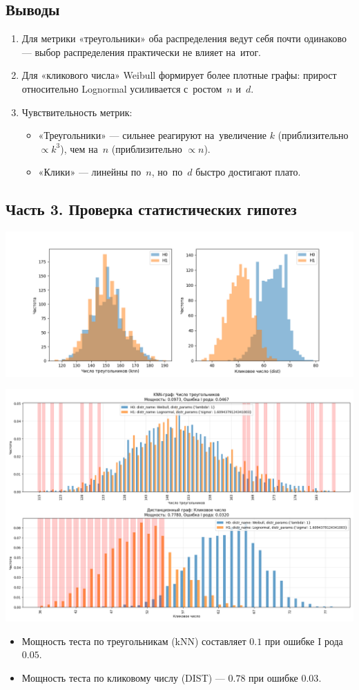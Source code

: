 \documentclass[12pt,a4paper]{article}
\begin{document}
\subsection*{Выводы}

\begin{enumerate}
  \item Для метрики «треугольники» оба распределения ведут себя почти одинаково --- выбор распределения практически не влияет на~итог.
  \item Для «кликового числа» Weibull формирует более плотные графы: прирост относительно Lognormal усиливается с~ростом~$n$ и~$d$.
  \item Чувствительность метрик:
        \begin{itemize}
          \item «Треугольники» --- сильнее реагируют на~увеличение $k$ (приблизительно $\propto k^{3}$), чем на~$n$ (приблизительно $\propto n$).
          \item «Клики» --- линейны по~$n$, но~по~$d$ быстро достигают плато.
        \end{itemize}
\end{enumerate}

\subsection*{Часть 3. Проверка статистических гипотез}
\vspace{-1em}

\begin{center}
  \includegraphics[width=0.8\linewidth]{part3_results_0_Yaroslav.png}
\end{center}
\begin{center}
  \includegraphics[width=0.95\linewidth]{part3_results_1_Yaroslav.png}
\end{center}

\begin{itemize}
  \item Мощность теста по треугольникам (kNN) составляет $0.1$ при ошибке I рода $0.05$.
  \item Мощность теста по кликовому числу (DIST) — $0.78$ при ошибке $0.03$.
\end{itemize}

\end{document}
